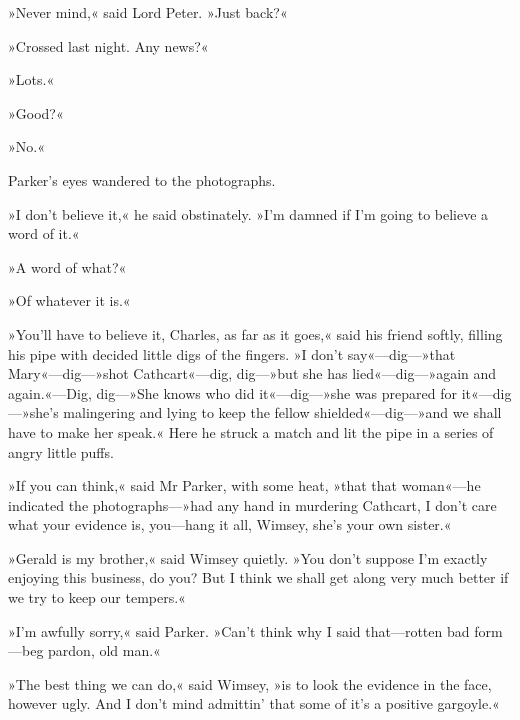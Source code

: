 »Never mind,« said Lord Peter. »Just back?«

»Crossed last night. Any news?«

»Lots.«

»Good?«

»No.«

Parker's eyes wandered to the photographs.

»I don't believe it,« he said obstinately. »I'm damned if I'm going to believe a word of it.«

»A word of what?«

»Of whatever it is.«

»You'll have to believe it, Charles, as far as it goes,« said his friend softly, filling his pipe with decided little digs of the fingers. »I don't say«---dig---»that Mary«---dig---»shot Cathcart«---dig, dig---»but she has lied«---dig---»again and again.«---Dig, dig---»She knows who did it«---dig---»she was prepared for it«---dig---»she's malingering and lying to keep the fellow shielded«---dig---»and we shall have to make her speak.« Here he struck a match and lit the pipe in a series of angry little puffs.

»If you can think,« said Mr Parker, with some heat, »that that woman«---he indicated the photographs---»had any hand in murdering Cathcart, I don't care what your evidence is, you\allowbreak---\allowbreak hang it all, Wimsey, she's your own sister.«

»Gerald is my brother,« said Wimsey quietly. »You don't suppose I'm exactly enjoying this business, do you? But I think we shall get along very much better if we try to keep our tempers.«

»I'm awfully sorry,« said Parker. »Can't think why I said that\allowbreak---\allowbreak rotten bad form\allowbreak---\allowbreak beg pardon, old man.«

»The best thing we can do,« said Wimsey, »is to look the evidence in the face, however ugly. And I don't mind admittin' that some of it's a positive gargoyle.«

